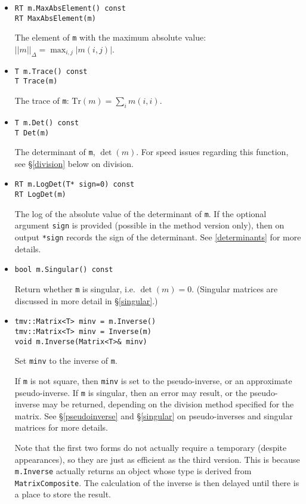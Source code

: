 \documentclass[twoside,letterpaper,11pt]{article}
\renewcommand{\tt}[1]{{\texttt {#1}}}
\begin{document}
\begin{itemize}
\item
\begin{verbatim}
RT m.MaxAbsElement() const
RT MaxAbsElement(m)
\end{verbatim}
The element of \tt{m} with the maximum absolute value: 
$||m||_\Delta = \max_{i,j} |m(i,j)|$.

\item
\begin{verbatim}
T m.Trace() const
T Trace(m)
\end{verbatim}
The trace of \tt{m}: $\mathrm{Tr}(m) = \sum_i m(i,i)$.

\item
\begin{verbatim}
T m.Det() const
T Det(m)
\end{verbatim}
The determinant of \tt{m}, $\det(m)$.  For speed issues regarding this function, see 
\S\ref{division} below on division.

\item
\begin{verbatim}
RT m.LogDet(T* sign=0) const
RT LogDet(m)
\end{verbatim}
The log of the absolute value of the determinant of \tt{m}.  If the optional argument \tt{sign} is 
provided (possible in the method version only), then on output \tt{*sign} records the sign of the determinant.  See \ref{determinants} 
for more details.

\item
\begin{verbatim}
bool m.Singular() const
\end{verbatim}
Return whether \tt{m} is singular, i.e. $\det(m) = 0$.
(Singular matrices are discussed in more detail in \S\ref{singular}.)

\item
\begin{verbatim}
tmv::Matrix<T> minv = m.Inverse()
tmv::Matrix<T> minv = Inverse(m)
void m.Inverse(Matrix<T>& minv)
\end{verbatim}
Set \tt{minv} to the inverse of \tt{m}.  

If \tt{m} is not square, then \tt{minv} is set to the pseudo-inverse, or an approximate
pseudo-inverse.  If \tt{m} is singular, then an error may result, or the pseudo-inverse
may be returned, depending on the division method specified for the matrix.  
See \S\ref{pseudoinverse} and \S\ref{singular} 
on pseudo-inverses and singular matrices for more details.

Note that the first two forms do not actually require a 
temporary (despite appearances), so they are just as efficient as the third version.
This is because \tt{m.Inverse} actually returns an object whose type is derived from
\tt{MatrixComposite}.  The calculation of the inverse is then delayed 
until there is a place to store the result.


\end{itemize}
\end{document}

